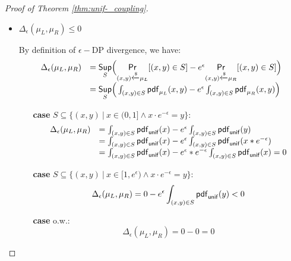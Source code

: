 \documentclass[a4paper,11pt]{article}
\begin{document}
\begin{proof}[Proof of Theorem \ref{thm:unif-_coupling}]
\begin{itemize}
\begin{itemize}
		\item $\projr(\mu_R) = \mu_2$ 

		Equivalent to show$\pdf_{\projr(\mu_R)}  = \pdf_{\mu_2}$.

		By definition of the $\projr$ and $\pdf$ of $\mu_R$, we have $\forall y \in \float$:
		\[
			\pdf_{\projr(\mu_R)}(y) = 
			\begin{cases}
			\int_{x}\pdf_{\uniform}(y) 
			& x \cdot e^{-\epsilon} = y 
			\land y \in (0, 1]\\
			0       & o.w.
			\end{cases} 
			= 
			\begin{cases}
			\pdf_{\uniform}(y) & y \in (0, 1]\\
			0       & o.w.
			\end{cases}
			=
			\pdf_{\mu_2}(y)
		\]
	\end{itemize}	

	\item $\Delta_{\epsilon}(\mu_L, \mu_R) \leq 0$

	By definition of $\epsilon-$DP divergence, we have:
	 \[
	 \begin{array}{ll}
	 \Delta_{\epsilon}(\mu_L, \mu_R) 
	 & = \underset{S}{\mathsf{Sup}}
	 \Big(
	 \underset{(x,y) \xleftarrow{\$} \mu_L}{\mathsf{Pr}}[(x,y) \in S] - e^{\epsilon} \underset{(x,y) \xleftarrow{\$} \mu_R}{\mathsf{Pr}}[(x,y) \in S]
	 \Big) \\
	 & =\underset{S}{\mathsf{Sup}}
	 \Big(
	 \int_{(x,y) \in S} \mathsf{pdf}_{\mu_L}(x, y) - e^{\epsilon} \int_{(x,y) \in S} \mathsf{pdf}_{\mu_R}(x, y)
	 \Big)	 
	 \end{array}
	 \]
	 \begin{itemize}
	 	\item[{\bf case}]
	 	$S \subseteq \{(x, y) ~|~ 
	 	x \in (0, 1] \land x \cdot e^{-\epsilon} = y \}$:
		\[
		 \begin{array}{ll}
		 \Delta_{\epsilon}(\mu_L, \mu_R) 
		 & = 
		 \int_{(x,y) \in S} \mathsf{pdf}_{\mathsf{unif}}(x) - e^{\epsilon} \int_{(x,y) \in S} \mathsf{pdf}_{\mathsf{unif}}(y)\\
		 & = 
		 \int_{(x,y) \in S} \mathsf{pdf}_{\mathsf{unif}}(x) - e^{\epsilon} \int_{(x,y) \in S} \mathsf{pdf}_{\mathsf{unif}}(x * e^{-\epsilon})\\ 
		 & = 
		 \int_{(x,y) \in S} \mathsf{pdf}_{\mathsf{unif}}(x) - e^{\epsilon}* e^{-\epsilon} \int_{(x,y) \in S} \mathsf{pdf}_{\mathsf{unif}}(x) 
		 = 0 
		 \end{array}
		 \]
	 	\item[{\bf case}] $S \subseteq \{(x, y) 
	 	~|~ x \in [1, e^{\epsilon}) 
	 	\land x \cdot e^{-\epsilon} = y \}$:
		 \[
		 \Delta_{\epsilon}(\mu_L, \mu_R) 
		 = 
		 0 - e^{\epsilon} \int_{(x,y) \in S} \mathsf{pdf}_{\mathsf{unif}}(y) <0
		 \]
	 	\item[{\bf case}] o.w.:
		 \[
		 \Delta_{\epsilon}(\mu_L, \mu_R) = 0 - 0 =  0 
		 \]	 	

	 \end{itemize}

\end{itemize}
\end{proof}
%
\newpage
\end{document}
